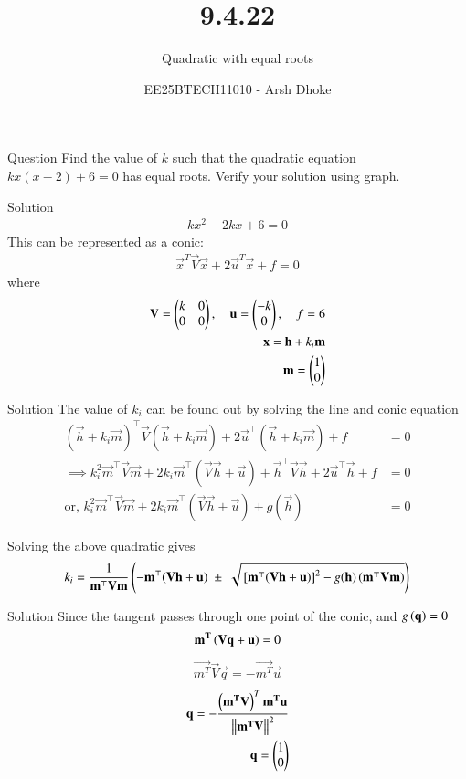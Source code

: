 \documentclass{beamer}
\title{9.4.22}
\subtitle{Quadratic with equal roots}
\author{EE25BTECH11010 - Arsh Dhoke}
\date{}
\begin{document}
\frame{\titlepage}

\begin{frame}{Question}
Find the value of $k$ such that the quadratic equation
$
kx(x-2) + 6 = 0
$
has equal roots. Verify your solution using graph.
\end{frame}

\begin{frame}{Solution}
\begin{align}
kx^2 - 2kx + 6 = 0
\end{align}
This can be represented as a conic:
\begin{align}
\vec{x}^{T}\vec{V}\vec{x} + 2\vec{u}^{T}\vec{x} + f = 0
\end{align}
where
\begin{align}
\mathbf{V} = \begin{pmatrix}k & 0 \\ 0 & 0\end{pmatrix}, \quad
\mathbf{u} = \begin{pmatrix}-k \\ 0\end{pmatrix}, \quad
f = 6 \\
\mathbf{x} = \mathbf{h} + k_i\mathbf{m} \\
\mathbf{m}=\begin{pmatrix}1 \\ 0\end{pmatrix}
\end{align}
\end{frame}

\begin{frame}{Solution}
The value of $k_i$ can be found out by solving the line and conic equation
\begin{align}
(\vec{h} + k_i \vec{m})^{\top} \vec{V} (\vec{h} + k_i \vec{m}) + 2\vec{u}^{\top} (\vec{h} + k_i \vec{m}) + f &= 0 \\
\implies k_i^{2} \vec{m}^{\top}\vec{V}\vec{m} + 2k_i \vec{m}^{\top} (\vec{V}\vec{h} + \vec{u}) + \vec{h}^{\top}\vec{V}\vec{h} + 2\vec{u}^{\top}\vec{h} + f &= 0 \\
\text{or, } k_i^{2} \vec{m}^{\top}\vec{V}\vec{m} + 2k_i \vec{m}^{\top} (\vec{V}\vec{h} + \vec{u}) + g(\vec{h}) &= 0
\end{align}

Solving the above quadratic gives 
\begin{align}
k_i = \frac{1}{\mathbf{m}^{\top}\mathbf{V}\mathbf{m}}
\left(
    -\mathbf{m}^{\top} (\mathbf{V}\mathbf{h} + \mathbf{u})
    \;\pm\;
    \sqrt{ {}\left[\mathbf{m}^{\top}(\mathbf{V}\mathbf{h} + \mathbf{u})\right]^2
    - g(\mathbf{h}) \, (\mathbf{m}^{\top}\mathbf{V}\mathbf{m}) }
    \right)
\end{align}
\end{frame}

\begin{frame}{Solution}
Since the tangent passes through one point of the conic, and $g\left(\mathbf{q}\right)=0$
\begin{align}
\mathbf{m^T}\left(\mathbf{\mathbf{V}\mathbf{q} + \mathbf{u}}\right) = 0
\end{align}
\begin{align}
\vec{m^T}\vec{V}\vec{q} = -\vec{m^T}\vec{u}
\end{align}
\begin{align}
\mathbf{q} = -\frac{\left(\mathbf{m^T}\mathbf{V}\right)^T\mathbf{m^T}\mathbf{u}}{\left\lVert\mathbf{m^T}\mathbf{V}\right\rVert^2} \\
\mathbf{q}=\begin{pmatrix}1 \\ 0\end{pmatrix}
\end{align}
\end{frame}
\end{document}
